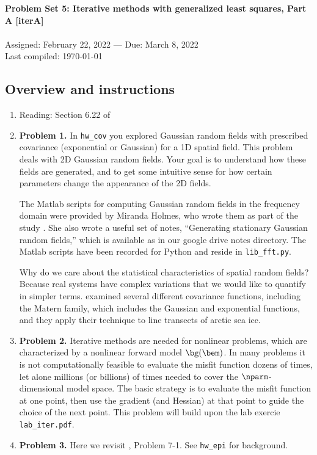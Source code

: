 \documentclass[11pt,titlepage,fleqn]{article}
\begin{document}
 

\begin{spacing}{1.2}
\centering
{\large \bf Problem Set 5: Iterative methods with generalized least squares, Part A [iterA]} \\
\cltag\ \\
Assigned: February 22, 2022 --- Due: March 8, 2022 \\
Last compiled: \today
\end{spacing}


\subsection*{Overview and instructions}

\begin{enumerate}
\item Reading: Section 6.22 of \citet{Tarantola2005}

\item {\bf Problem 1.} In \verb+hw_cov+ you explored Gaussian random fields with prescribed covariance (exponential or Gaussian) for a 1D spatial field. This problem deals with 2D Gaussian random fields. Your goal is to understand how these fields are generated, and to get some intuitive sense for how certain parameters change the appearance of the 2D fields.

The Matlab scripts for computing Gaussian random fields in the frequency domain were provided by Miranda Holmes, who wrote them as part of the study \citet{BuhlerHolmes2009}. She also wrote a useful set of notes, ``Generating stationary Gaussian random fields,'' which is available as in our google drive notes directory. The Matlab scripts have been recorded for Python and reside in \verb+lib_fft.py+.

Why do we care about the statistical characteristics of spatial random fields? Because real systems have complex variations that we would like to quantify in simpler terms. \citet{Gneiting2012} examined several different covariance functions, including the Matern family, which includes the Gaussian and exponential functions, and they apply their technique to line transects of arctic sea ice.

\item {\bf Problem 2.} Iterative methods are needed for nonlinear problems, which are characterized by a nonlinear forward model $\bg(\bem)$. In many problems it is not computationally feasible to evaluate the misfit function dozens of times, let alone millions (or billions) of times needed to cover the $\nparm$-dimensional model space. The basic strategy is to evaluate the misfit function at one point, then use the gradient (and Hessian) at that point to guide the choice of the next point. This problem will build upon the lab exercie \verb+lab_iter.pdf+.

\item {\bf Problem 3.} Here we revisit \citet{Tarantola2005}, Problem 7-1. See \verb+hw_epi+ for background.

\end{enumerate}
\end{document}
